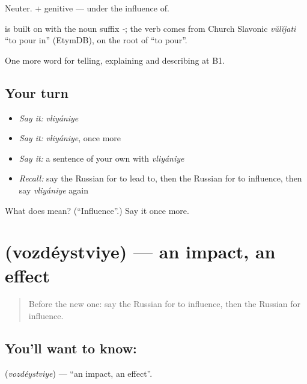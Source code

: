 Neuter. \emph{ } + genitive — under the influence of.

\begin{cousinweb}
\textbf{} is built on \emph{} with the noun suffix \emph{-}; the verb comes from Church Slavonic \emph{vŭlĭjati} \textquotedblleft{}to pour in\textquotedblright{} (EtymDB), on the root of \emph{} \textquotedblleft{}to pour\textquotedblright{}.
\end{cousinweb}

\begin{grammarlens}[title={What you've built}]
One more word for telling, explaining and describing at B1.
\end{grammarlens}

\subsection*{Your turn}
\begin{itemize}
\raggedright
  \item \emph{Say it:} \emph{vliyániye}
  \item \emph{Say it:} \emph{vliyániye}, once more
  \item \emph{Say it:} a sentence of your own with \emph{vliyániye}
  \item \emph{Recall:} say the Russian for to lead to, then the Russian for to influence, then say \emph{vliyániye} again
\end{itemize}

\begin{tcolorbox}[breakable,colback=teal!4,colframe=teal!35!black,title={Before you move on}]
What does  mean? (\textquotedblleft{}Influence\textquotedblright{}.) Say it once more.
\end{tcolorbox}
\section[\texorpdfstring{\ru{воздействие} (vozdéystviye)}{воздействие (vozdéystviye)}]{ (vozdéystviye) — an impact, an effect}

\label{lesson:RU-C349-vozdeystvie}



\begin{quote}
Before the new one: say the Russian for to influence, then the Russian for influence.
\end{quote}

\subsection*{You'll want to know: }
\textbf{} (\emph{vozdéystviye}) — \textquotedblleft{}an impact, an effect\textquotedblright{}.

